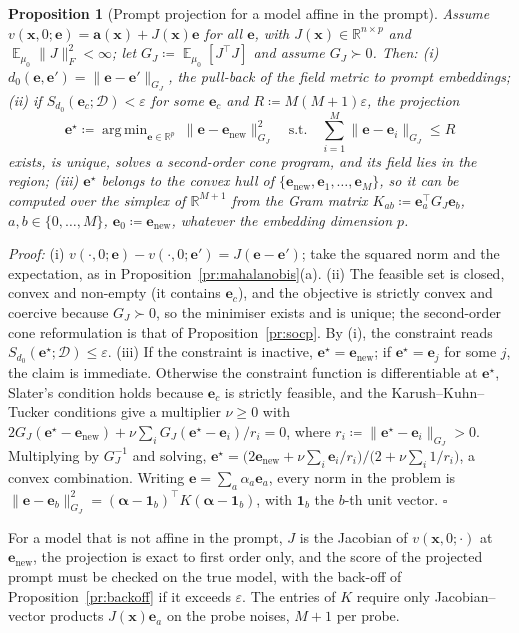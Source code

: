 \documentclass{article}
\DeclareMathOperator*{\argmin}{arg\,min}
\DeclareMathOperator{\E}{\mathbb{E}}
\newcommand{\RR}{\mathbb{R}}
\newcommand{\cD}{\mathcal{D}}                       %
\newcommand{\bx}{\mathbf{x}}
\newcommand{\be}{\mathbf{e}}                       %
\theoremstyle{plain}
\newtheorem{proposition}{Proposition}
\begin{document}
\begin{proposition}[Prompt projection for a model affine in the prompt]\label{pr:prompt_proj}
Assume $v(\bx,0;\be)=\mathbf{a}(\bx)+J(\bx)\be$ for all $\be$, with $J(\bx)\in\RR^{n\times p}$ and
$\E_{\mu_0}\|J\|_F^2<\infty$; let $G_J\coloneqq\E_{\mu_0}[J^\top J]$ and assume $G_J\succ0$. Then:
(i) $d_0(\be,\be')=\|\be-\be'\|_{G_J}$, the pull-back of the field metric to prompt embeddings;
(ii) if $S_{d_0}(\be_c;\cD)<\varepsilon$ for some $\be_c$ and $R\coloneqq M(M+1)\varepsilon$, the projection
\[
  \be^\star\coloneqq\argmin_{\be\in\RR^p}\ \|\be-\be_{\mathrm{new}}\|_{G_J}^2\quad\text{s.t.}\quad\sum_{i=1}^M\|\be-\be_i\|_{G_J}\leq R
\]
exists, is unique, solves a second-order cone program, and its field lies in the region;
(iii) $\be^\star$ belongs to the convex hull of $\{\be_{\mathrm{new}},\be_1,\dots,\be_M\}$, so it can be computed over
the simplex of $\RR^{M+1}$ from the Gram matrix $K_{ab}\coloneqq\be_a^\top G_J\be_b$, $a,b\in\{0,\dots,M\}$,
$\be_0\coloneqq\be_{\mathrm{new}}$, whatever the embedding dimension $p$.
\end{proposition}
\textit{Proof:}
(i) $v(\cdot,0;\be)-v(\cdot,0;\be')=J(\be-\be')$; take the squared norm and the expectation, as in
Proposition~\ref{pr:mahalanobis}(a).
(ii) The feasible set is closed, convex and non-empty (it contains $\be_c$), and the objective is
strictly convex and coercive because $G_J\succ0$, so the minimiser exists and is unique; the
second-order cone reformulation is that of Proposition~\ref{pr:socp}. By (i), the constraint reads
$S_{d_0}(\be^\star;\cD)\leq\varepsilon$.
(iii) If the constraint is inactive, $\be^\star=\be_{\mathrm{new}}$; if $\be^\star=\be_j$ for some $j$, the claim is
immediate. Otherwise the constraint function is differentiable at $\be^\star$, Slater's condition holds
because $\be_c$ is strictly feasible, and the Karush--Kuhn--Tucker conditions give a multiplier
$\nu\geq0$ with $2G_J(\be^\star-\be_{\mathrm{new}})+\nu\sum_iG_J(\be^\star-\be_i)/r_i=0$, where
$r_i\coloneqq\|\be^\star-\be_i\|_{G_J}>0$. Multiplying by $G_J^{-1}$ and solving,
$\be^\star=\big(2\be_{\mathrm{new}}+\nu\sum_i\be_i/r_i\big)/\big(2+\nu\sum_i1/r_i\big)$, a convex combination. Writing
$\be=\sum_a\alpha_a\be_a$, every norm in the problem is
$\|\be-\be_b\|_{G_J}^2=(\boldsymbol{\alpha}-\mathbf{1}_b)^\top K(\boldsymbol{\alpha}-\mathbf{1}_b)$, with $\mathbf{1}_b$ the
$b$-th unit vector. \hfill $\square$

For a model that is not affine in the prompt, $J$ is the Jacobian of $v(\bx,0;\cdot)$ at
$\be_{\mathrm{new}}$, the projection is exact to first order only, and the score of the projected prompt must
be checked on the true model, with the back-off of Proposition~\ref{pr:backoff} if it exceeds $\varepsilon$.
The entries of $K$ require only Jacobian--vector products $J(\bx)\be_a$ on the probe noises, $M+1$ per
probe.
\end{document}
